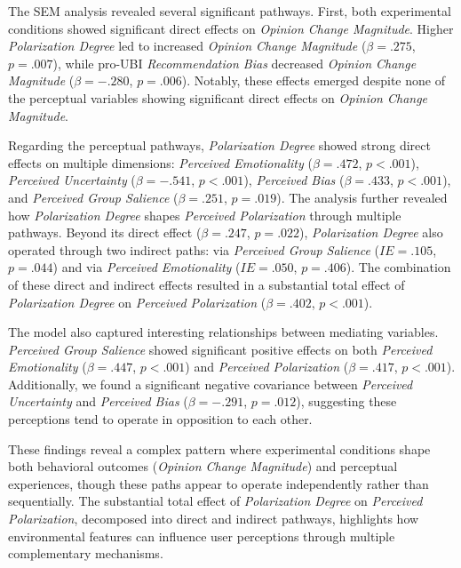 The SEM analysis revealed several significant pathways. First, both experimental conditions showed significant direct effects on \emph{Opinion Change Magnitude}. Higher \emph{Polarization Degree} led to increased \emph{Opinion Change Magnitude} ($\beta = .275$, $p = .007$), while pro-UBI \emph{Recommendation Bias} decreased \emph{Opinion Change Magnitude} ($\beta = -.280$, $p = .006$). Notably, these effects emerged despite none of the perceptual variables showing significant direct effects on \emph{Opinion Change Magnitude}.

Regarding the perceptual pathways, \emph{Polarization Degree} showed strong direct effects on multiple dimensions: \emph{Perceived Emotionality} ($\beta = .472$, $p < .001$), \emph{Perceived Uncertainty} ($\beta = -.541$, $p < .001$), \emph{Perceived Bias} ($\beta = .433$, $p < .001$), and \emph{Perceived Group Salience} ($\beta = .251$, $p = .019$). The analysis further revealed how \emph{Polarization Degree} shapes \emph{Perceived Polarization} through multiple pathways. Beyond its direct effect ($\beta = .247$, $p = .022$), \emph{Polarization Degree} also operated through two indirect paths: via \emph{Perceived Group Salience} ($IE = .105$, $p = .044$) and via \emph{Perceived Emotionality} ($IE = .050$, $p = .406$). The combination of these direct and indirect effects resulted in a substantial total effect of \emph{Polarization Degree} on \emph{Perceived Polarization} ($\beta = .402$, $p < .001$).

The model also captured interesting relationships between mediating variables. \emph{Perceived Group Salience} showed significant positive effects on both \emph{Perceived Emotionality} ($\beta = .447$, $p < .001$) and \emph{Perceived Polarization} ($\beta = .417$, $p < .001$). Additionally, we found a significant negative covariance between \emph{Perceived Uncertainty} and \emph{Perceived Bias} ($\beta = -.291$, $p = .012$), suggesting these perceptions tend to operate in opposition to each other.

These findings reveal a complex pattern where experimental conditions shape both behavioral outcomes (\emph{Opinion Change Magnitude}) and perceptual experiences, though these paths appear to operate independently rather than sequentially. The substantial total effect of \emph{Polarization Degree} on \emph{Perceived Polarization}, decomposed into direct and indirect pathways, highlights how environmental features can influence user perceptions through multiple complementary mechanisms.

